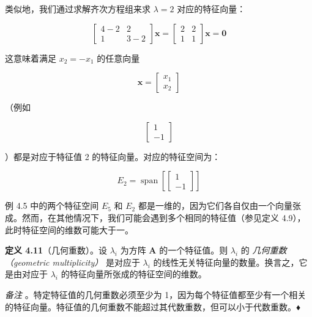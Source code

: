 \begin{notebox}
类似地，我们通过求解齐次方程组来求 $ \lambda = 2 $ 对应的特征向量：

\begin{equation}
\begin{bmatrix} 4 - 2 & 2 \\ 1 & 3 - 2 \end{bmatrix} \boldsymbol{x} = \begin{bmatrix} 2 & 2 \\ 1 & 1 \end{bmatrix} \boldsymbol{x} = \boldsymbol{0}
\tag{4.34}\label{eq:4-34}
\end{equation}

这意味着满足 $ x_2 = -x_1 $ 的任意向量

\begin{equation*}
\boldsymbol{x} = \begin{bmatrix} x_1 \\ x_2 \end{bmatrix}
\end{equation*}

（例如

\begin{equation*}
\begin{bmatrix} 1 \\ -1 \end{bmatrix}
\end{equation*}

）都是对应于特征值 2 的特征向量。对应的特征空间为：

\begin{equation}
E_2 = \operatorname{span}\left[\begin{bmatrix} 1 \\ -1 \end{bmatrix}\right]
\tag{4.35}\label{eq:4-35}
\end{equation}
\end{notebox}

例 4.5 中的两个特征空间 $ E_5 $ 和 $ E_2 $ 都是一维的，因为它们各自仅由一个向量张成。然而，在其他情况下，我们可能会遇到多个相同的特征值（参见定义 4.9），此时特征空间的维数可能大于一。

\textbf{定义 4.11}（几何重数）。设 $ \lambda_i $ 为方阵 $ \boldsymbol{A} $ 的一个特征值。则 $ \lambda_i $ 的 \emph{几何重数（geometric multiplicity）} 是对应于 $ \lambda_i $ 的线性无关特征向量的数量。换言之，它是由对应于 $ \lambda_i $ 的特征向量所张成的特征空间的维数。

\emph{备注} 。特定特征值的几何重数必须至少为 1，因为每个特征值都至少有一个相关的特征向量。特征值的几何重数不能超过其代数重数，但可以小于代数重数。♦

